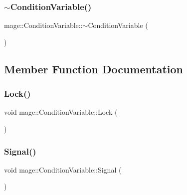 \hypertarget{classmage_1_1_condition_variable_accd5253beb65b2904428afdb889cf00b}{}\label{classmage_1_1_condition_variable_accd5253beb65b2904428afdb889cf00b} 
\subsubsection{\texorpdfstring{$\sim$\+Condition\+Variable()}{~ConditionVariable()}}
{\footnotesize\ttfamily mage\+::\+Condition\+Variable\+::$\sim$\+Condition\+Variable (\begin{DoxyParamCaption}{ }\end{DoxyParamCaption})}



\subsection{Member Function Documentation}
\hypertarget{classmage_1_1_condition_variable_acb0fa4a842b6979ac35c70dab0f43813}{}\label{classmage_1_1_condition_variable_acb0fa4a842b6979ac35c70dab0f43813} 
\subsubsection{\texorpdfstring{Lock()}{Lock()}}
{\footnotesize\ttfamily void mage\+::\+Condition\+Variable\+::\+Lock (\begin{DoxyParamCaption}{ }\end{DoxyParamCaption})}

\hypertarget{classmage_1_1_condition_variable_a09e52f0d51c10ee565a895d2444175d9}{}\label{classmage_1_1_condition_variable_a09e52f0d51c10ee565a895d2444175d9} 
\subsubsection{\texorpdfstring{Signal()}{Signal()}}
{\footnotesize\ttfamily void mage\+::\+Condition\+Variable\+::\+Signal (\begin{DoxyParamCaption}{ }\end{DoxyParamCaption})}

